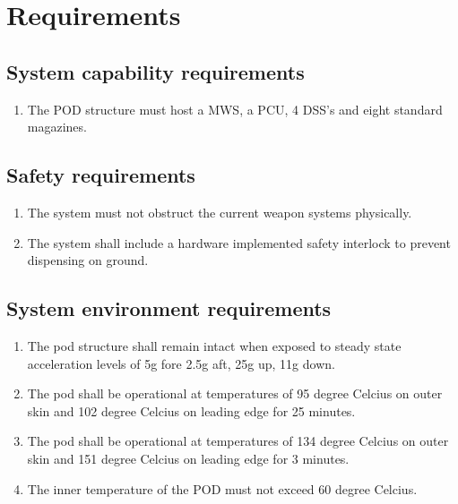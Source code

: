\documentclass[Main]{subfiles}
\begin{document}
\setcounter{chapter}{2}
\chapter{Requirements}

\section{System capability requirements}
\begin{enumerate}[{SR}-1.1]
\item The POD structure must host a MWS, a PCU, 4 DSS's and eight standard magazines.

\end{enumerate}

\section{Safety requirements}
\begin{enumerate}[{SR}-2.1]
\item The system must not obstruct the current weapon systems physically.

\item The system shall include a hardware implemented safety interlock to prevent dispensing on ground.

\end{enumerate}

\section{System environment requirements}

\begin{enumerate}[{SR}-3.1]
\item The pod structure shall remain intact when exposed to steady state acceleration levels of 5g fore 2.5g aft, 25g up, 11g down.

\item The pod shall be operational at temperatures of 95 degree Celcius on outer skin and 102 degree Celcius on leading edge for 25 minutes.

\item The pod shall be operational at temperatures of 134 degree Celcius on outer skin and 151 degree Celcius on leading edge for 3 minutes.

\item The inner temperature of the POD must not exceed 60 degree Celcius.

\end{enumerate}
\end{document}
